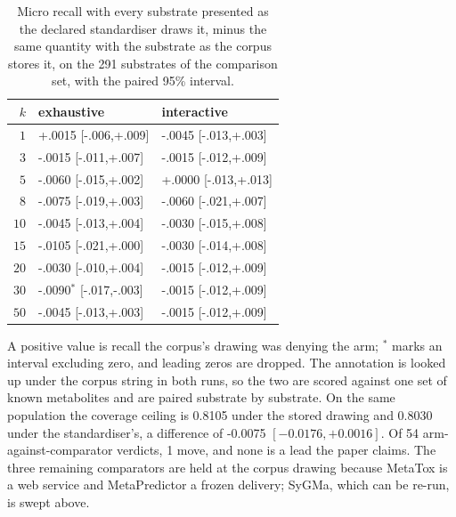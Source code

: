 \begin{table}[h]
\centering\small
\begin{threeparttable}
\caption{Micro recall with every substrate presented as the declared standardiser draws it, minus the same quantity with the substrate as the corpus stores it, on the 291 substrates of the comparison set, with the paired 95\% interval.}
\label{tab:si-dialect}
\begin{tabular}{rll}
\toprule
$k$ & exhaustive & interactive \\
\midrule
$1$ & +.0015\phantom{$^{*}$} {\scriptsize [-.006,+.009]} & -.0045\phantom{$^{*}$} {\scriptsize [-.013,+.003]} \\
$3$ & -.0015\phantom{$^{*}$} {\scriptsize [-.011,+.007]} & -.0015\phantom{$^{*}$} {\scriptsize [-.012,+.009]} \\
$5$ & -.0060\phantom{$^{*}$} {\scriptsize [-.015,+.002]} & +.0000\phantom{$^{*}$} {\scriptsize [-.013,+.013]} \\
$8$ & -.0075\phantom{$^{*}$} {\scriptsize [-.019,+.003]} & -.0060\phantom{$^{*}$} {\scriptsize [-.021,+.007]} \\
$10$ & -.0045\phantom{$^{*}$} {\scriptsize [-.013,+.004]} & -.0030\phantom{$^{*}$} {\scriptsize [-.015,+.008]} \\
$15$ & -.0105\phantom{$^{*}$} {\scriptsize [-.021,+.000]} & -.0030\phantom{$^{*}$} {\scriptsize [-.014,+.008]} \\
$20$ & -.0030\phantom{$^{*}$} {\scriptsize [-.010,+.004]} & -.0015\phantom{$^{*}$} {\scriptsize [-.012,+.009]} \\
$30$ & -.0090$^{*}$ {\scriptsize [-.017,-.003]} & -.0015\phantom{$^{*}$} {\scriptsize [-.012,+.009]} \\
$50$ & -.0045\phantom{$^{*}$} {\scriptsize [-.013,+.003]} & -.0015\phantom{$^{*}$} {\scriptsize [-.012,+.009]} \\
\bottomrule
\end{tabular}
\begin{tablenotes}[flushleft]\footnotesize
\item A positive value is recall the corpus's drawing was denying the arm; $^{*}$ marks an interval excluding zero, and leading zeros are dropped. The annotation is looked up under the corpus string in both runs, so the two are scored against one set of known metabolites and are paired substrate by substrate. On the same population the coverage ceiling is 0.8105 under the stored drawing and 0.8030 under the standardiser's, a difference of -0.0075 $[-0.0176, +0.0016]$. Of 54 arm-against-comparator verdicts, 1 move, and none is a lead the paper claims. The three remaining comparators are held at the corpus drawing because MetaTox is a web service and MetaPredictor a frozen delivery; SyGMa, which can be re-run, is swept above.
\end{tablenotes}
\end{threeparttable}
\end{table}
